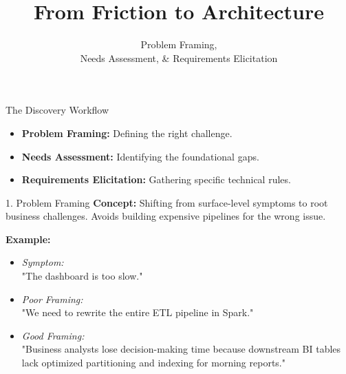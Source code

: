 \documentclass[12pt]{beamer}
\title{From Friction to Architecture}
\subtitle{Problem Framing,\\ Needs Assessment, \& Requirements Elicitation}
\date{\color{aggiemaroon}{
DAEN 459 - Fall 2026\\
\textbf{Alexander Abuabara}\\
}}
\begin{document}

\begin{frame}
    \titlepage
\end{frame}

\begin{frame}{The Discovery Workflow}
    \begin{itemize}
        \item \textbf{Problem Framing:} Defining the right challenge.
        \item \textbf{Needs Assessment:} Identifying the foundational gaps.
        \item \textbf{Requirements Elicitation:} Gathering specific technical rules.
    \end{itemize}
\end{frame}

\begin{frame}{1. Problem Framing}
    \textbf{Concept:} Shifting from surface-level symptoms to root business challenges. Avoids building expensive pipelines for the wrong issue.
    
    \vspace{0.3cm}
    \textbf{Example:}
    \begin{itemize}
        \item \emph{Symptom:}\\"The dashboard is too slow."
        \item \emph{Poor Framing:}\\"We need to rewrite the entire ETL pipeline in Spark."
        \item \emph{Good Framing:}\\"Business analysts lose decision-making time because downstream BI tables lack optimized partitioning and indexing for morning reports."
    \end{itemize}
\end{frame}
\end{document}

